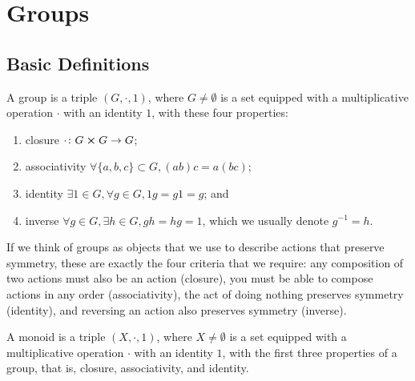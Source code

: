 \section{Groups}

\subsection{Basic Definitions}

\begin{definition}
    A group is a triple \((G,\cdot,1)\),
    where \(G \neq \emptyset\) is a set
    equipped with a multiplicative operation \(\cdot\)
    with an identity \(1\),
    with these four properties:
    \begin{enumerate}[label={(\roman*)}, itemsep=0mm]
        \item closure \(\cdot\colon G \cross G\to G\);
        \item associativity \(\forall \{a,b,c\} \subset G, (ab)c = a(bc)\);
        \item identity \(\exists 1 \in G, \forall g \in G, 1g = g1 = g\); and
        \item inverse \(\forall g \in G, \exists h \in G, gh = hg = 1\),
            which we usually denote \(g^{-1} = h\).
    \end{enumerate}
\end{definition}
\begin{remark}
    If we think of groups as objects that we use
    to describe actions that preserve symmetry,
    these are exactly the four criteria that we require:
    any composition of two actions must also be an action (closure),
    you must be able to compose actions in any order (associativity),
    the act of doing nothing preserves symmetry (identity),
    and reversing an action also preserves symmetry (inverse).
\end{remark}

\begin{definition}
    A monoid is a triple \((X,\cdot,1)\),
    where \(X \neq \emptyset\) is a set
    equipped with a multiplicative operation \(\cdot\)
    with an identity \(1\),
    with the first three properties of a group,
    that is, closure, associativity, and identity.
\end{definition}


